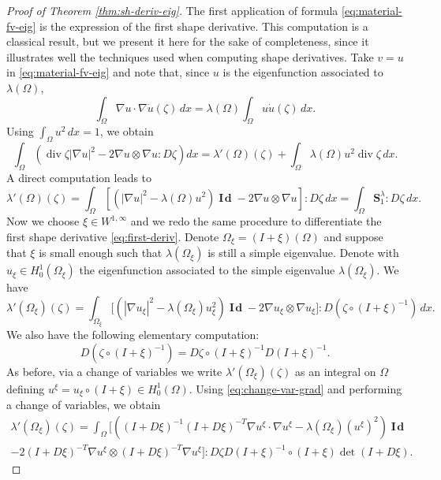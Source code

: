 \documentclass[JEP,XML,SOM,Unicode,ThmDefs,NoFloatCountersInSection,published]{cedram}
\theoremstyle{plain}
\theoremstyle{definition}
\newcommand{\di}{\operatorname{div}}
\newcommand{\bo}[1]{{\boldsymbol#1}}
\newcommand{\Id}{\operatorname{{\bo I\!\bo d}}}
\begin{document}
\begin{proof}[Proof of Theorem \ref{thm:sh-deriv-eig}]
The first application of formula \eqref{eq:material-fv-eig} is the expression of the first shape derivative. This computation is a classical result, but we present it here for the sake of completeness, since it illustrates well the techniques used when computing shape derivatives. Take $v=u$ in \eqref{eq:material-fv-eig} and note that, since $u$ is the eigenfunction associated to $\lambda(\Omega)$,
\[
\int_\Omega \nabla u \cdot \nabla \dot u(\zeta) \, dx = \lambda(\Omega) \int_\Omega u \dot u(\zeta)\, dx.
\]
Using $\int_\Omega u^2\, dx=1$, we obtain
\[
\int_\Omega \left(\di \zeta |\nabla u|^2 -2 \nabla u\otimes \nabla u : D\zeta \right) dx=\lambda'(\Omega)(\zeta)+\int_\Omega \lambda(\Omega)u^2 \di \zeta\, dx .
\]
A direct computation leads to
\begin{equation}
\lambda'(\Omega)(\zeta) = \int_\Omega [(|\nabla u|^2-\lambda(\Omega) u^2)\Id-2\nabla u\otimes \nabla u] : D\zeta\, dx= \int_\Omega \bo S_1^\lambda : D\zeta\, dx .
\label{eq:first-deriv}
\end{equation}
Now we choose $\xi \in W^{1,\infty}$ and we redo the same procedure to differentiate the first shape derivative \eqref{eq:first-deriv}. Denote $\Omega_\xi = (I+\xi)(\Omega)$ and suppose that $\xi$ is small enough such that $\lambda(\Omega_\xi)$ is still a simple eigenvalue. Denote with $u_\xi \in H_0^1(\Omega_\xi)$ the eigenfunction associated to the simple eigenvalue $\lambda(\Omega_\xi)$. We have
\begin{equation}
\lambda'(\Omega_\xi)(\zeta) = \int_{\Omega_\xi} \big[(|\nabla u_\xi |^2-\lambda(\Omega_\xi) u_\xi^2)\Id-2\nabla u_\xi \otimes \nabla u_\xi \big] : D(\zeta\circ (I+\xi)^{-1})\, dx.
\label{eq:first-deriv-moved}
\end{equation}
We also have the following elementary computation:
\[
D(\zeta \circ (I+\xi)^{-1}) = D\zeta \circ (I+\xi)^{-1} D(I+\xi)^{-1}.
\]
As before, via a change of variables we write $\lambda'(\Omega_\xi)(\zeta)$ as an integral on $\Omega$ defining $u^\xi = u_\xi\circ (I+\xi) \in H_0^1(\Omega)$. Using \eqref{eq:change-var-grad} and performing a change of variables, we obtain
\vspace*{-5pt}
\begin{multline*} \lambda'(\Omega_\xi)(\zeta) = \int_\Omega \big[\left((I+D\xi)^{-1}(I+D\xi)^{-T} \nabla u^\xi\cdot \nabla u^\xi -\lambda(\Omega_\xi) (u^\xi)^2\right)\Id \\
-2 (I+D\xi)^{-T} \nabla u^\xi \otimes (I+D\xi)^{-T} \nabla u^\xi\big] : D\zeta D(I+\xi)^{-1}\circ (I+\xi) \det(I+D\xi).
\end{multline*}


\end{proof}
\end{document}
